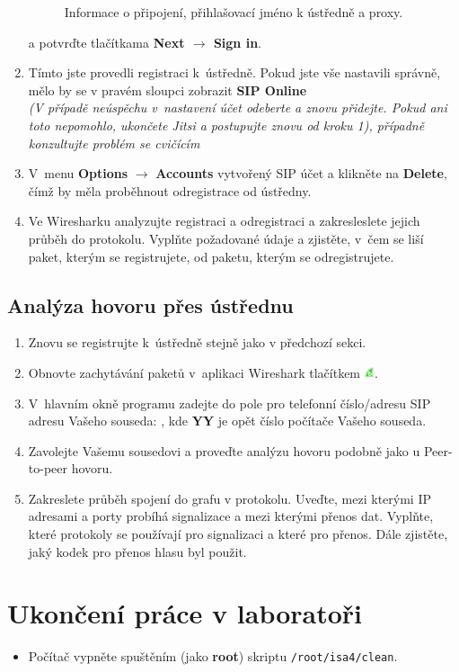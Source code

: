 \begin{enumerate}
\begin{figure}[h!]
  \caption{Informace o připojení, přihlašovací jméno k ústředně a proxy.}
  \label{fig:sip_connection}
\end{figure}
    a potvrďte tlačítkama {\bf Next $\rightarrow$ Sign in}.
    \item Tímto jste provedli registraci k ústředně. Pokud jste vše nastavili správně, mělo by se v pravém sloupci zobrazit {\bf SIP Online} \\
    {\it (V případě neúspěchu v nastavení účet odeberte a znovu přidejte. Pokud ani toto nepomohlo, ukončete Jitsi a postupujte znovu od kroku 1), případně konzultujte problém se cvičícím}
    \item V menu {\bf Options} $\rightarrow$ {\bf Accounts} vytvořený SIP účet a klikněte na {\bf Delete}, čímž by měla proběhnout odregistrace od ústředny.
    \item Ve Wiresharku analyzujte registraci a odregistraci a zakresleslete jejich průběh do protokolu. Vyplňte požadované údaje a zjistěte, v čem se liší paket, kterým se registrujete, od paketu, kterým se odregistrujete.
\end{enumerate}


\subsection{Analýza hovoru přes ústřednu}
\begin{enumerate}
    \item Znovu se registrujte k ústředně stejně jako v předchozí sekci.
    \item Obnovte zachytávání paketů v aplikaci Wireshark tlačítkem \includegraphics[width=3mm]{img/ws_start.png}.
    \item V hlavním okně programu zadejte do pole pro telefonní číslo/adresu SIP adresu Vašeho souseda: , kde {\bf YY} je opět číslo počítače Vašeho souseda.
    \item Zavolejte Vašemu sousedovi a proveďte analýzu hovoru podobně jako u Peer-to-peer hovoru.
    \item Zakreslete průběh spojení do grafu v protokolu. Uveďte, mezi kterými IP adresami a porty probíhá signalizace a mezi kterými přenos dat. Vyplňte, které protokoly se používají pro signalizaci a které pro přenos. Dále zjistěte, jaký kodek pro přenos hlasu byl použit.
\end{enumerate}

\section{Ukončení práce v laboratoři}
\begin{itemize}
  \item Počítač vypněte spuštěním (jako {\bf root}) skriptu {\tt /root/isa4/clean}.
\end{itemize}
